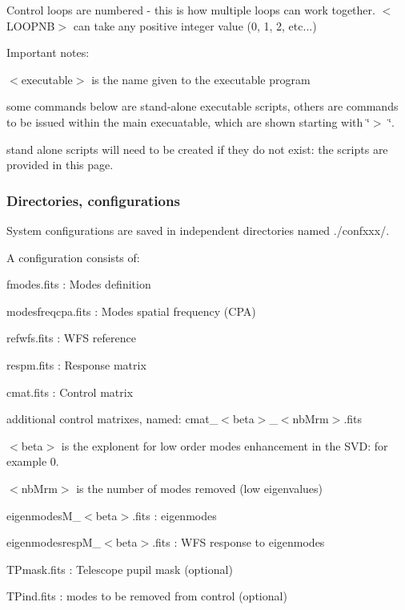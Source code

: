 Control loops are numbered -\/ this is how multiple loops can work together. $<$\+L\+O\+O\+P\+N\+B$>$ can take any positive integer value (0, 1, 2, etc...)

Important notes\+:
\begin{DoxyItemize}
\item $<$executable$>$ is the name given to the executable program
\item some commands below are stand-\/alone executable scripts, others are commands to be issued within the main execuatable, which are shown starting with \char`\"{}$>$ \char`\"{}.
\item stand alone scripts will need to be created if they do not exist\+: the scripts are provided in this page.
\end{DoxyItemize}

\subsubsection*{Directories, configurations}

System configurations are saved in independent directories named ./confxxx/.

A configuration consists of\+:
\begin{DoxyItemize}
\item fmodes.\+fits \+: Modes definition
\item modesfreqcpa.\+fits \+: Modes spatial frequency (C\+P\+A)
\item refwfs.\+fits \+: W\+F\+S reference
\item respm.\+fits \+: Response matrix
\item cmat.\+fits \+: Control matrix
\item additional control matrixes, named\+: cmat\+\_\+$<$beta$>$\+\_\+$<$nb\+Mrm$>$.\+fits
\begin{DoxyItemize}
\item $<$beta$>$ is the explonent for low order modes enhancement in the S\+V\+D\+: for example 0.
\item $<$nb\+Mrm$>$ is the number of modes removed (low eigenvalues)
\end{DoxyItemize}
\item eigenmodes\+M\+\_\+$<$beta$>$.\+fits \+: eigenmodes
\item eigenmodesresp\+M\+\_\+$<$beta$>$.\+fits \+: W\+F\+S response to eigenmodes
\item T\+Pmask.\+fits \+: Telescope pupil mask (optional)
\item T\+Pind.\+fits \+: modes to be removed from control (optional)
\end{DoxyItemize}

